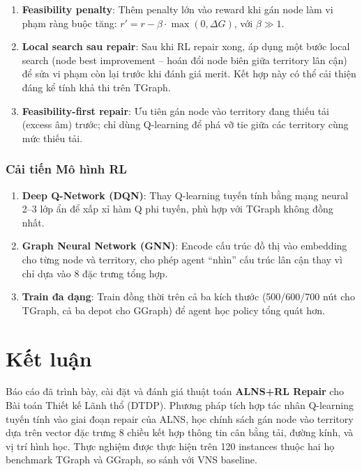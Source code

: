 \documentclass[12pt, a4paper]{article}
\begin{document}
\begin{enumerate}
  \item \textbf{Feasibility penalty}: Thêm penalty lớn vào reward khi gán node
        làm vi phạm ràng buộc tăng: $r' = r - \beta \cdot \max(0, \Delta G)$,
        với $\beta \gg 1$.

  \item \textbf{Local search sau repair}: Sau khi RL repair xong, áp dụng một
        bước local search (node best improvement -- hoán đổi node biên giữa
        territory lân cận) để sửa vi phạm còn lại trước khi đánh giá merit.
        Kết hợp này có thể cải thiện đáng kể tính khả thi trên TGraph.

  \item \textbf{Feasibility-first repair}: Ưu tiên gán node vào territory đang
        thiếu tải (excess âm) trước; chỉ dùng Q-learning để phá vỡ tie giữa
        các territory cùng mức thiếu tải.
\end{enumerate}

\subsubsection{Cải tiến Mô hình RL}

\begin{enumerate}
  \item \textbf{Deep Q-Network (DQN)}: Thay Q-learning tuyến tính bằng mạng
        neural 2--3 lớp ẩn để xấp xỉ hàm Q phi tuyến, phù hợp với TGraph không
        đồng nhất.

  \item \textbf{Graph Neural Network (GNN)}: Encode cấu trúc đồ thị vào
        embedding cho từng node và territory, cho phép agent ``nhìn'' cấu trúc
        lân cận thay vì chỉ dựa vào 8 đặc trưng tổng hợp.

  \item \textbf{Train đa dạng}: Train đồng thời trên cả ba kích thước
        (500/600/700 nút cho TGraph, cả ba depot cho GGraph) để agent học policy
        tổng quát hơn.
\end{enumerate}

\section{Kết luận}
\label{sec:conclusion}

Báo cáo đã trình bày, cài đặt và đánh giá thuật toán \textbf{ALNS+RL Repair}
cho Bài toán Thiết kế Lãnh thổ (DTDP). Phương pháp tích hợp tác nhân Q-learning
tuyến tính vào giai đoạn repair của ALNS, học chính sách gán node vào territory
dựa trên vector đặc trưng 8 chiều kết hợp thông tin cân bằng tải, đường kính,
và vị trí hình học. Thực nghiệm được thực hiện trên 120 instances thuộc hai họ
benchmark TGraph và GGraph, so sánh với VNS baseline.
\end{document}
